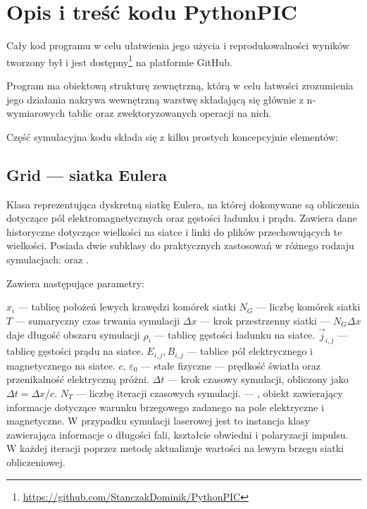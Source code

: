 \section{Opis i treść kodu PythonPIC}\label{sec:code}
Cały kod programu w celu ułatwienia jego użycia i reprodukowalności wyników tworzony był i jest
dostępny\footnote{\url{https://github.com/StanczakDominik/PythonPIC}} na platformie GitHub.

Program ma obiektową strukturę zewnętrzną, którą w celu łatwości
zrozumienia jego działania nakrywa wewnętrzną warstwę składającą się
głównie z n-wymiarowych tablic  oraz zwektoryzowanych
operacji na nich.

Część symulacyjna kodu składa się z kilku prostych koncepcyjnie elementów:

\subsection{Grid --- siatka Eulera}
Klasa reprezentująca dyskretną siatkę Eulera, na której dokonywane są
obliczenia dotyczące pól elektromagnetycznych oraz gęstości ładunku i
prądu. Zawiera dane historyczne dotyczące wielkości na siatce
i linki do plików  przechowujących te wielkości.
Posiada dwie subklasy do praktycznych zastosowań w różnego rodzaju
symulacjach:  oraz .

Zawiera następujące parametry:
\begin{itemize}
    \itemi{} $x_i$ --- tablicę położeń lewych krawędzi komórek siatki
    \itemi{} $N_G$ --- liczbę komórek siatki
    \itemi{} $T$ --- sumaryczny czas trwania symulacji
    \itemi{} $\Delta x$ --- krok przestrzenny siatki --- $N_G \Delta x$ daje
        długość obszaru symulacji
    \itemi{} $\rho_i$ --- tablicę gęstości ładunku na siatce.
    \itemi{} $\vec{j}_{i,j}$ --- tablicę gęstości prądu na siatce.
    \itemi{} $E_{i,j}, B_{i,j}$ --- tablice pól elektrycznego i magnetycznego na siatce.
    \itemi{} $c$, $\varepsilon_0$ --- stałe fizyczne --- prędkość światła oraz
        przenikalność elektryczną próżni.
    \itemi{} $\Delta t$ --- krok czasowy symulacji, obliczony jako $\Delta t =
        \Delta x / c$.
    \itemi{} $N_T$ --- liczbę iteracji czasowych symulacji.
    \itemi{}  --- , obiekt zawierający informacje dotyczące
        warunku brzegowego zadanego na pole elektryczne i magnetyczne. W przypadku symulacji
        laserowej jest to instancja klasy  zawierająca informacje o
        długości fali, kształcie obwiedni
        i polaryzacji impulsu. W każdej iteracji  poprzez metodę
         aktualizuje wartości na lewym brzegu siatki obliczeniowej.
\end{itemize}

